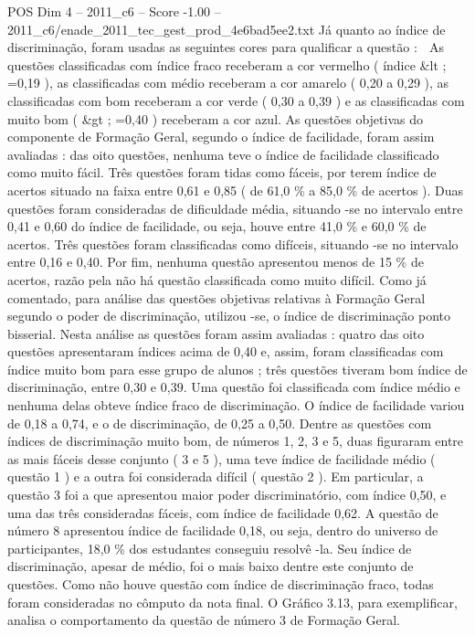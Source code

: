 \begin{textsample}{POS Dim 4 – 2011\_c6 – Score -1.00 – 2011\_c6/enade\_2011\_tec\_gest\_prod\_4e6bad5ee2.txt}
Já quanto ao índice de discriminação, foram usadas as seguintes cores para qualificar a questão :  As questões classificadas com índice fraco receberam a cor vermelho ( índice \&lt ; =0,19 ), as classificadas com médio receberam a cor amarelo ( 0,20 a 0,29 ), as classificadas com bom receberam a cor verde ( 0,30 a 0,39 ) e as classificadas com muito bom ( \&gt ; =0,40 ) receberam a cor azul.
As questões objetivas do componente de Formação Geral, segundo o índice de facilidade, foram assim avaliadas : das oito questões, nenhuma teve o índice de facilidade classificado como muito fácil.
Três questões foram tidas como fáceis, por terem índice de acertos situado na faixa entre 0,61 e 0,85 ( de 61,0 \% a 85,0 \% de acertos ).
Duas questões foram consideradas de dificuldade média, situando -se no intervalo entre 0,41 e 0,60 do índice de facilidade, ou seja, houve entre 41,0 \% e 60,0 \% de acertos.
Três questões foram classificadas como difíceis, situando -se no intervalo entre 0,16 e 0,40.
Por fim, nenhuma questão apresentou menos de 15 \% de acertos, razão pela não há questão classificada como muito difícil.
Como já comentado, para análise das questões objetivas relativas à Formação Geral segundo o poder de discriminação, utilizou -se, o índice de discriminação ponto bisserial.
Nesta análise as questões foram assim avaliadas : quatro das oito questões apresentaram índices acima de 0,40 e, assim, foram classificadas com índice muito bom para esse grupo de alunos ; três questões tiveram bom índice de discriminação, entre 0,30 e 0,39.
Uma questão foi classificada com índice médio e nenhuma delas obteve índice fraco de discriminação.
O índice de facilidade variou de 0,18 a 0,74, e o de discriminação, de 0,25 a 0,50.
Dentre as questões com índices de discriminação muito bom, de números 1, 2, 3 e 5, duas figuraram entre as mais fáceis desse conjunto ( 3 e 5 ), uma teve índice de facilidade médio ( questão 1 ) e a outra foi considerada difícil ( questão 2 ).
Em particular, a questão 3 foi a que apresentou maior poder discriminatório, com índice 0,50, e uma das três consideradas fáceis, com índice de facilidade 0,62.
A questão de número 8 apresentou índice de facilidade 0,18, ou seja, dentro do universo de participantes, 18,0 \% dos estudantes conseguiu resolvê -la.
Seu índice de discriminação, apesar de médio, foi o mais baixo dentre este conjunto de questões.
Como não houve questão com índice de discriminação fraco, todas foram consideradas no cômputo da nota final.
O Gráfico 3.13, para exemplificar, analisa o comportamento da questão de número 3 de Formação Geral.

\end{textsample}
